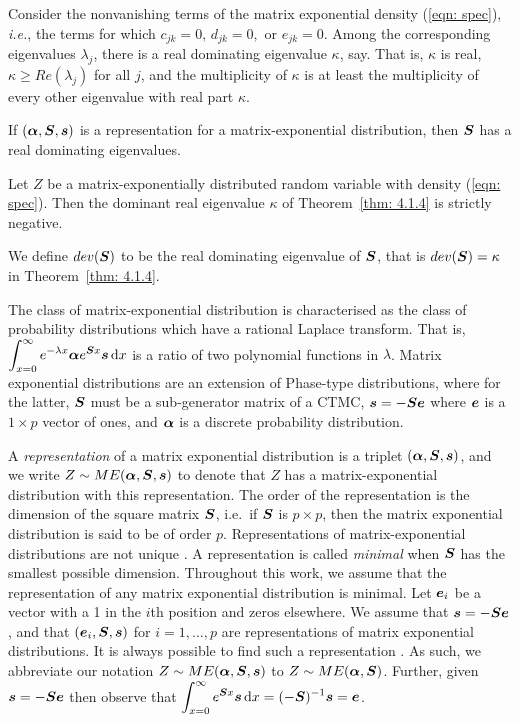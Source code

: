 \begin{thm}\label{thm: 4.1.4}
	Consider the nonvanishing terms of the matrix exponential density (\ref{eqn: spec}), \emph{i.e.}, the terms for which \(c_{jk}=0,\,d_{jk} =0,\) or \(e_{jk}=0\). Among the corresponding eigenvalues \(\lambda_j\), there is a real dominating eigenvalue \(\kappa\), say. That is, \(\kappa\) is real, \(\kappa \geq Re(\lambda_j)\) for all \(j\), and the multiplicity of \(\kappa\) is at least the multiplicity of every other eigenvalue with real part \(\kappa\).
\end{thm}
\begin{cor}
If \((\boldsymbol \alpha, \boldsymbol S, \boldsymbol s)\) is a representation for a matrix-exponential distribution, then \(\boldsymbol S\) has a real dominating eigenvalues.
\end{cor}
\begin{thm}
	Let \(Z\) be a matrix-exponentially distributed random variable with density (\ref{eqn: spec}). Then the dominant real eigenvalue \(\kappa\) of Theorem~\ref{thm: 4.1.4} is strictly negative. 
\end{thm}
We define \(dev(\boldsymbol S)\) to be the real dominating eigenvalue of \(\boldsymbol S\), that is \(dev(\boldsymbol S)=\kappa\) in Theorem~\ref{thm: 4.1.4}.

The class of matrix-exponential distribution is characterised as the class of probability distributions which have a rational Laplace transform. That is, \(\displaystyle \int_{x=0}^\infty e^{-\lambda x}\boldsymbol \alpha e^{\boldsymbol S x}\boldsymbol s \, \mathrm{d} x\) is a ratio of two polynomial functions in \(\lambda\). Matrix exponential distributions are an extension of Phase-type distributions, where for the latter, \(\boldsymbol S\) must be a sub-generator matrix of a CTMC, \(\boldsymbol s = -\boldsymbol S\boldsymbol e\) where \(\boldsymbol e\) is a \(1\times p\) vector of ones, and \(\boldsymbol \alpha\) is a discrete probability distribution.  

A \emph{representation} of a matrix exponential distribution is a triplet \((\boldsymbol \alpha, \boldsymbol S, \boldsymbol s)\), and we write \(Z\sim ME(\boldsymbol \alpha, \boldsymbol S, \boldsymbol s)\) to denote that \(Z\) has a matrix-exponential distribution with this representation. The order of the representation is the dimension of the square matrix \(\boldsymbol S\), i.e.~if \(\boldsymbol S\) is \(p\times p\), then the matrix exponential distribution is said to be of order \(p\). Representations of matrix-exponential distributions are not unique \citep{MEinAP}. A representation is called \emph{minimal} when \(\boldsymbol S\) has the smallest possible dimension. Throughout this work, we assume that the representation of any matrix exponential distribution is minimal. Let \(\boldsymbol e_i\) be a vector with a 1 in the \(i\)th position and zeros elsewhere. We assume that \(\boldsymbol s = -\boldsymbol S\boldsymbol e\), and that \((\boldsymbol e_i,\boldsymbol S,\boldsymbol s)\) for \(i=1,\dots,p\) are representations of matrix exponential distributions. It is always possible to find such a representation \cite[Theorem 4.5.17, Corollary 4.5.18]{MEinAP}. As such, we abbreviate our notation \(Z\sim ME(\boldsymbol \alpha, \boldsymbol S, \boldsymbol s)\) to \(Z\sim ME(\boldsymbol \alpha, \boldsymbol S)\). Further, given \(\boldsymbol s=-\boldsymbol S\boldsymbol e\) then observe that  \(\displaystyle \int_{x=0}^\infty e^{\boldsymbol S x} \boldsymbol s\, \mathrm{d} x = (-\boldsymbol S)^{-1}\boldsymbol s= \boldsymbol e\). 

